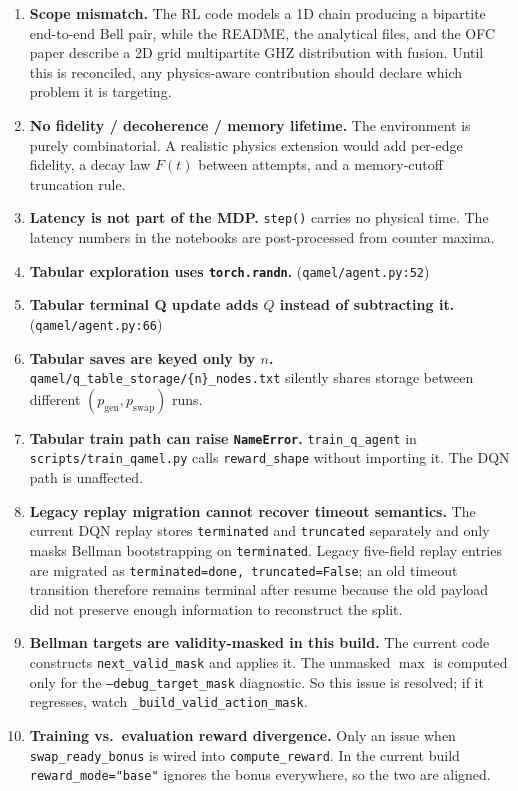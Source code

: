 \documentclass[11pt]{article}
\newcommand{\code}[1]{\texttt{#1}}
\newcommand{\file}[1]{\texttt{\small #1}}
\newcommand{\pgen}{p_{\text{gen}}}
\newcommand{\pswap}{p_{\text{swap}}}
\begin{document}
\begin{enumerate}
  \item \textbf{Scope mismatch.} The RL code models a 1D chain producing a bipartite end-to-end Bell pair, while the README, the analytical files, and the OFC paper describe a 2D grid multipartite GHZ distribution with fusion. Until this is reconciled, any physics-aware contribution should declare which problem it is targeting.
  \item \textbf{No fidelity / decoherence / memory lifetime.} The environment is purely combinatorial. A realistic physics extension would add per-edge fidelity, a decay law $F(t)$ between attempts, and a memory-cutoff truncation rule.
  \item \textbf{Latency is not part of the MDP.} \code{step()} carries no physical time. The latency numbers in the notebooks are post-processed from counter maxima.
  \item \textbf{Tabular exploration uses \code{torch.randn}.} (\file{qamel/agent.py:52})
  \item \textbf{Tabular terminal Q update adds $Q$ instead of subtracting it.} (\file{qamel/agent.py:66})
  \item \textbf{Tabular saves are keyed only by $n$.} \file{qamel/q\_table\_storage/\{n\}\_nodes.txt} silently shares storage between different $(\pgen,\pswap)$ runs.
  \item \textbf{Tabular train path can raise \code{NameError}.} \code{train\_q\_agent} in \file{scripts/train\_qamel.py} calls \code{reward\_shape} without importing it. The DQN path is unaffected.
  \item \textbf{Legacy replay migration cannot recover timeout semantics.} The current DQN replay stores \code{terminated} and \code{truncated} separately and only masks Bellman bootstrapping on \code{terminated}. Legacy five-field replay entries are migrated as \code{terminated=done, truncated=False}; an old timeout transition therefore remains terminal after resume because the old payload did not preserve enough information to reconstruct the split.
  \item \textbf{Bellman targets are validity-masked in this build.} The current code constructs \code{next\_valid\_mask} and applies it. The unmasked $\max$ is computed only for the \code{--debug\_target\_mask} diagnostic. So this issue is resolved; if it regresses, watch \code{\_build\_valid\_action\_mask}.
  \item \textbf{Training vs.\ evaluation reward divergence.} Only an issue when \code{swap\_ready\_bonus} is wired into \code{compute\_reward}. In the current build \code{reward\_mode="base"} ignores the bonus everywhere, so the two are aligned.

\end{enumerate}
\end{document}
